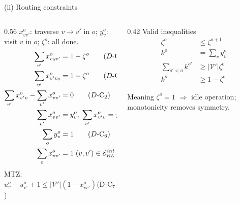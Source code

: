\documentclass[aspectratio=169,10pt]{beamer}
\begin{document}
\begin{frame}{(ii) Routing constraints}
  \begin{columns}[T,onlytextwidth]
    \begin{column}{0.56\textwidth}
      {\scriptsize $x_{vv'}^o$: traverse $v{\to}v'$ in $o$; $y_v^o$: visit $v$ in $o$; $\zeta^o$: all done.}
      {\footnotesize
      \begin{align*}
        \sum_{v'}x_{v_0v'}^o &=1-\zeta^o \tag{$D$-C$_1$}\\
        \sum_{v'}x_{v'v_0}^o &=1-\zeta^o \tag{$D$-C$_3$}\\
        \sum_{v'}x_{v'v}^o-\sum_{v'}x_{vv'}^o &=0 \tag{$D$-C$_2$}\\
        \sum_{v'}x_{vv'}^o &=y_v^o,\;\sum_{v'}x_{v'v}^o=y_v^o \tag{$D$-C$_{4,5}$}\\
        \sum_o y_v^o &=1 \tag{$D$-C$_6$}\\
        \sum_o x_{vv'}^o &=1\;(v,v')\in\mathcal{E}_{RL}^{int} \tag{$D$-C$_8$}
      \end{align*}}
      {\scriptsize MTZ: $u_v^o-u_{v'}^o+1\le |\mathcal{V}'|(1-x_{vv'}^o)$\hfill (D-C$_7$)}
    \end{column}
    \begin{column}{0.42\textwidth}
      \centering
      {\small Valid inequalities}\\[0.05cm]
      {\footnotesize
      \begin{align*}
        \zeta^o &\le\zeta^{o+1} \tag{Mon.}\\
        k^o &=\sum_{v}y_v^o \tag{$k$-C}\\
        \sum_{o'<o}k^{o'} &\ge |\mathcal{V}'|\zeta^o \tag{VI-C$_1$}\\
        k^o &\ge 1-\zeta^o \tag{VI-C$_2$}
      \end{align*}}
      \begin{alertblock}{Meaning}
        {\scriptsize $\zeta^o{=}1$ $\Rightarrow$ idle operation; monotonicity removes symmetry.}
      \end{alertblock}
    \end{column}
  \end{columns}
\end{frame}
\end{document}
